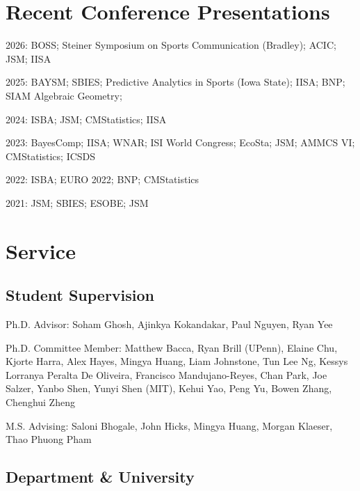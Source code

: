 \documentclass[10pt]{article}
\renewenvironment{itemize}{
  \begin{list}{}{
    \setlength{\leftmargin}{1.5em}
  }
}{
  \end{list}
}
\begin{document}
\section*{Recent Conference Presentations}

\begin{itemize}
\item{2026: BOSS; Steiner Symposium on Sports Communication (Bradley); ACIC; JSM; IISA}
\item{2025: BAYSM; SBIES; Predictive Analytics in Sports (Iowa State); IISA; BNP; SIAM Algebraic Geometry; }
\item{2024: ISBA; JSM; CMStatistics; IISA}
\item{2023: BayesComp; IISA; WNAR; ISI World Congress; EcoSta; JSM; AMMCS VI; CMStatistics; ICSDS}
\item{2022: ISBA; EURO 2022; BNP; CMStatistics}
\item{2021: JSM; SBIES; ESOBE; JSM}

\end{itemize}

\section*{Service}

\subsection*{Student Supervision}

\begin{itemize}
\item{Ph.D. Advisor:  Soham Ghosh, Ajinkya Kokandakar, Paul Nguyen, Ryan Yee}

\item{Ph.D. Committee Member: Matthew Bacca, Ryan Brill (UPenn), Elaine Chu, Kjorte Harra, Alex Hayes, Mingya Huang, Liam Johnstone, Tun Lee Ng, Kessys Lorranya Peralta De Oliveira, Francisco Mandujano-Reyes, Chan Park, Joe Salzer, Yanbo Shen, Yunyi Shen (MIT), Kehui Yao, Peng Yu, Bowen Zhang, Chenghui Zheng}

\item{M.S. Advising: Saloni Bhogale, John Hicks, Mingya Huang, Morgan Klaeser, Thao Phuong Pham}
\end{itemize}

\subsection*{Department \& University}
\end{document}
